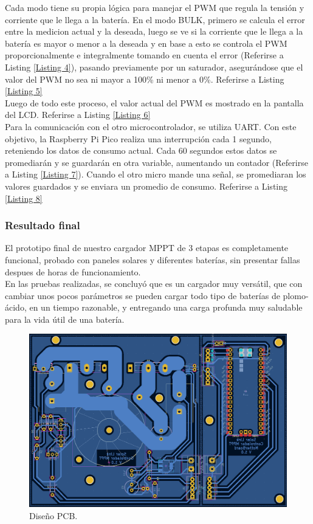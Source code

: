 Cada modo tiene su propia lógica para manejar el PWM que regula la tensión y corriente que le llega a la batería. En el modo BULK, primero se calcula el error entre la medicion actual y la deseada, luego se ve si la corriente que le llega a la batería es mayor o menor a la deseada y en base a esto se controla el PWM proporcionalmente e integralmente tomando en cuenta el error (Referirse a Listing \ref{Listing 4}), pasando previamente por un saturador, asegurándose que el valor del PWM no sea ni mayor a 100\% ni menor a 0\%. Referirse a Listing \ref{Listing 5}\\

Luego de todo este proceso, el valor actual del PWM es mostrado en la pantalla del LCD. Referirse a Listing \ref{Listing 6}\\

Para la comunicación con el otro microcontrolador, se utiliza UART. Con este objetivo, la Raspberry Pi Pico realiza una interrupción cada 1 segundo, reteniendo los datos de consumo actual. Cada 60 segundos estos datos se promediarán y se guardarán en otra variable, aumentando un contador (Referirse a Listing \ref{Listing 7}). Cuando el otro micro mande una señal, se promediaran los valores guardados y se enviara un promedio de consumo. Referirse a Listing \ref{Listing 8}\\

\subsubsection{Resultado final}

El prototipo final de nuestro cargador MPPT de 3 etapas es completamente funcional, probado con paneles solares y diferentes baterías, sin presentar fallas despues de horas de funcionamiento.\\

En las pruebas realizadas, se concluyó que es un cargador muy versátil, que con cambiar unos pocos parámetros se pueden cargar todo tipo de baterías de plomo-ácido, en un tiempo razonable, y entregando una carga profunda muy saludable para la vida útil de una batería.\\

\begin{figure}[H]
    \centering
    \includegraphics[width=1\linewidth]{MPPT/Screenshot_9.png}
    \caption{Diseño PCB.}
    \label{fig:PCB-MPPT}
\end{figure}

